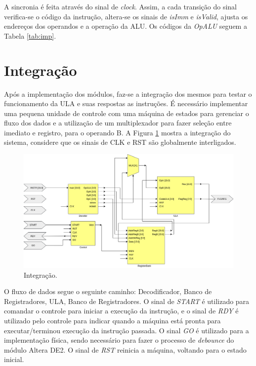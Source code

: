 \documentclass[11pt,a4paper,titlepage]{article}
\begin{document}
A sincronia é feita através do sinal de \textit{clock}. Assim, a cada transição do sinal verifica-se o código da instrução, altera-se os sinais de \textit{isImm} e \textit{isValid}, ajusta os endereços dos operandos e a operação da ALU. Os códigos da \textit{OpALU} seguem a Tabela \ref{tab:imp}.

\section{Integração}

Após a implementação dos módulos, faz-se a integração dos mesmos para testar o funcionamento da ULA e suas respostas as instruções. É necessário implementar uma pequena unidade de controle com uma máquina de estados para gerenciar o fluxo dos dados e a utilização de um multiplexador para fazer seleção entre imediato e registro, para o operando B. A Figura \ref{fig:blocomicro} mostra a integração do sistema, considere que os sinais de CLK e RST são globalmente interligados.

\begin{figure}[h]
\centering
\includegraphics[scale=0.4]{images/Microprocessor.png}
\caption{Integração.}
\label{fig:blocomicro}
\end{figure}

O fluxo de dados segue o seguinte caminho: Decodificador, Banco de Registradores, ULA, Banco de Registradores. O sinal de \textit{START} é utilizado para comandar o controle para iniciar a execução da instrução, e o sinal de \textit{RDY} é utilizado pelo controle para indicar quando a máquina está pronta para executar/terminou execução da instrução passada. O sinal \textit{GO} é utilizado para a implementação física, sendo necessário para fazer o processo de \textit{debounce} do módulo Altera DE2. O sinal de \textit{RST} reinicia a máquina, voltando para o estado inicial.
\end{document}
